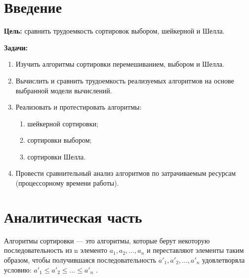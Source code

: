 \documentclass[12pt]{report}
\begin{document}
    
    \tableofcontents

    \newpage

    \chapter*{Введение}
    \textbf{Цель:} сравнить трудоемкость сортировок выбором, шейкерной и Шелла.

    \textbf{Задачи:}
    \begin{enumerate}
        \item Изучить алгоритмы сортировки перемешиванием, выбором и Шелла.
        \item Вычислить и сравнить трудоемкость реализуемых алгоритмов на основе выбранной модели вычислений.
        \item Реализовать и протестировать алгоритмы:
        \begin{enumerate}
            \item шейкерной сортировки;
            \item сортировки выбором;
            \item сортировки Шелла.
        \end{enumerate}
        \item Провести сравнительный анализ алгоритмов по затрачиваемым ресурсам (процессорному времени работы).
    \end{enumerate}
    \newpage


    \chapter{Аналитическая часть}
    Алгоритмы сортировки — это алгоритмы, которые берут некоторую последовательность из n элементо
    $a_1, a_2,..., a_n$ и переставляют элементы таким образом,
    чтобы получившаяся последовательность $a'_1,a'_2,...,a'_n$ удовлетворяла условию:
    $a'_1 \leqslant a'_2 \leqslant ... \leqslant a'_n$ \cite{SortAlgorithms}.
\end{document}
